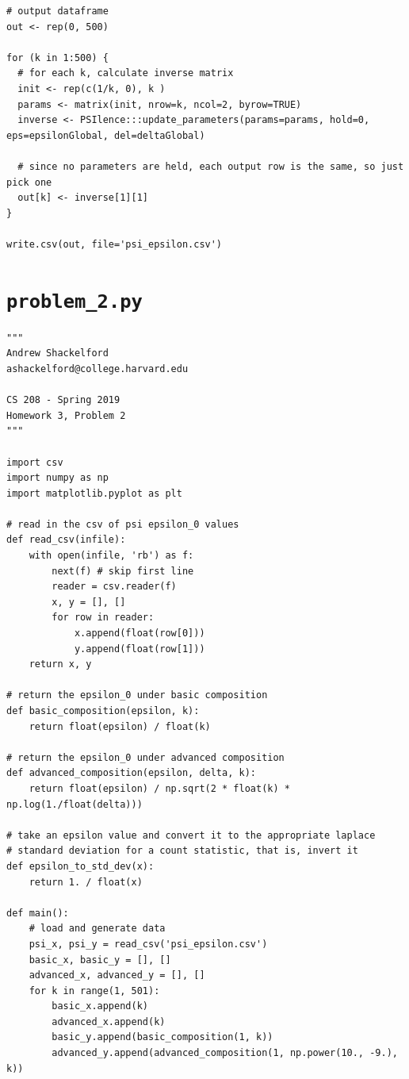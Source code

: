 \documentclass[12pt]{article}
\def\cl{\lstinline}
\begin{document}
\begin{appendices}
{\begin{lstlisting}
# output dataframe
out <- rep(0, 500)

for (k in 1:500) {
  # for each k, calculate inverse matrix
  init <- rep(c(1/k, 0), k )
  params <- matrix(init, nrow=k, ncol=2, byrow=TRUE)
  inverse <- PSIlence:::update_parameters(params=params, hold=0, eps=epsilonGlobal, del=deltaGlobal)
  
  # since no parameters are held, each output row is the same, so just pick one
  out[k] <- inverse[1][1]
}

write.csv(out, file='psi_epsilon.csv')
\end{lstlisting}
}

\newpage

\section{\cl{problem_2.py}}
\label{appendix:problem_2}

\begin{lstlisting}
"""
Andrew Shackelford
ashackelford@college.harvard.edu

CS 208 - Spring 2019
Homework 3, Problem 2
"""

import csv
import numpy as np
import matplotlib.pyplot as plt

# read in the csv of psi epsilon_0 values
def read_csv(infile):
    with open(infile, 'rb') as f:
        next(f) # skip first line
        reader = csv.reader(f)
        x, y = [], []
        for row in reader:
            x.append(float(row[0]))
            y.append(float(row[1]))
    return x, y

# return the epsilon_0 under basic composition
def basic_composition(epsilon, k):
    return float(epsilon) / float(k)

# return the epsilon_0 under advanced composition
def advanced_composition(epsilon, delta, k):
    return float(epsilon) / np.sqrt(2 * float(k) * np.log(1./float(delta)))

# take an epsilon value and convert it to the appropriate laplace
# standard deviation for a count statistic, that is, invert it
def epsilon_to_std_dev(x):
    return 1. / float(x)

def main():
    # load and generate data
    psi_x, psi_y = read_csv('psi_epsilon.csv')
    basic_x, basic_y = [], []
    advanced_x, advanced_y = [], []
    for k in range(1, 501):
        basic_x.append(k)
        advanced_x.append(k)
        basic_y.append(basic_composition(1, k))
        advanced_y.append(advanced_composition(1, np.power(10., -9.), k))


\end{lstlisting}
\end{appendices}
\end{document}

